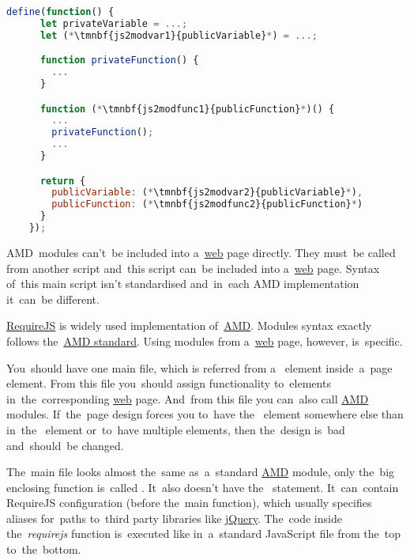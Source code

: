 \enlargethispage{10mm}
\begin{lstlisting}[language=JavaScript]
    define(function() {
      let privateVariable = ...;
      let (*\tmnbf{js2modvar1}{publicVariable}*) = ...;

      function privateFunction() {
        ...
      }

      function (*\tmnbf{js2modfunc1}{publicFunction}*)() {
        ...
        privateFunction();
        ...
      }

      return {
        publicVariable: (*\tmnbf{js2modvar2}{publicVariable}*),
        publicFunction: (*\tmnbf{js2modfunc2}{publicFunction}*)
      }
    });
\end{lstlisting}
\newpage

AMD~modules can't~be included into a~\hyperref[internetweb]{web} page directly.
They must~be called from another script and~this script can~be included into a~\hyperref[internetweb]{web} page.
Syntax of~this main script isn't standardised and~in~each AMD implementation it~can~be different.

\label{requirejs}
\href{https://requirejs.org}{RequireJS} is widely used implementation of~\hyperref[amd]{AMD}.
Modules syntax exactly follows the~\hyperref[amdsyntax]{AMD standard}.
Using modules from a~\hyperref[internetweb]{web} page, however, is~specific.

You~should have one main file, which is referred from a~ element inside~a~page  element.
From this file you~should assign functionality to~elements in~the~corresponding \hyperref[internetweb]{web} page.
And~from this file you can~also call \hyperref[amd]{AMD} modules.
If~the~page design forces you to~have the~ element somewhere else than in~the~ element or~to~have multiple  elements, then the~design is~bad and~should~be changed.

The~main file looks almost the~same as~a~standard \hyperref[amd]{AMD} module, only the~big enclosing function is~called .
It~also doesn't have the~ statement.
It~can~contain RequireJS configuration (before the~main  function), which usually specifies aliases for~paths to~third party libraries like \hyperref[jquery]{jQuery}.
The~code inside \mbox{the \textit{requirejs}} function is~executed like in~a~standard JavaScript file from the~top to~the~bottom.

